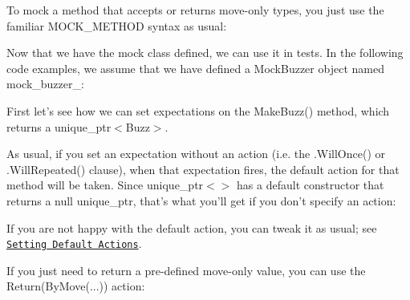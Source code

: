 To mock a method that accepts or returns move-\/only types, you just use the familiar {\ttfamily M\+O\+C\+K\+\_\+\+M\+E\+T\+H\+OD} syntax as usual\+:


\begin{DoxyCode}{0}
\DoxyCodeLine{ \textcolor{keyword}{public}:}
\DoxyCodeLine{\};}
\end{DoxyCode}


Now that we have the mock class defined, we can use it in tests. In the following code examples, we assume that we have defined a {\ttfamily Mock\+Buzzer} object named {\ttfamily mock\+\_\+buzzer\+\_\+}\+:


\begin{DoxyCode}{0}
\end{DoxyCode}


First let’s see how we can set expectations on the {\ttfamily Make\+Buzz()} method, which returns a {\ttfamily unique\+\_\+ptr$<$Buzz$>$}.

As usual, if you set an expectation without an action (i.\+e. the {\ttfamily .Will\+Once()} or {\ttfamily .Will\+Repeated()} clause), when that expectation fires, the default action for that method will be taken. Since {\ttfamily unique\+\_\+ptr$<$$>$} has a default constructor that returns a null {\ttfamily unique\+\_\+ptr}, that’s what you’ll get if you don’t specify an action\+:


\begin{DoxyCode}{0}
\DoxyCodeLine{\textcolor{comment}{// Use the default action.}}
\DoxyCodeLine{}
\DoxyCodeLine{\textcolor{comment}{// Triggers the previous EXPECT\_CALL.}}
\end{DoxyCode}


If you are not happy with the default action, you can tweak it as usual; see \href{#OnCall}{\tt Setting Default Actions}.

If you just need to return a pre-\/defined move-\/only value, you can use the {\ttfamily Return(\+By\+Move(...))} action\+:


